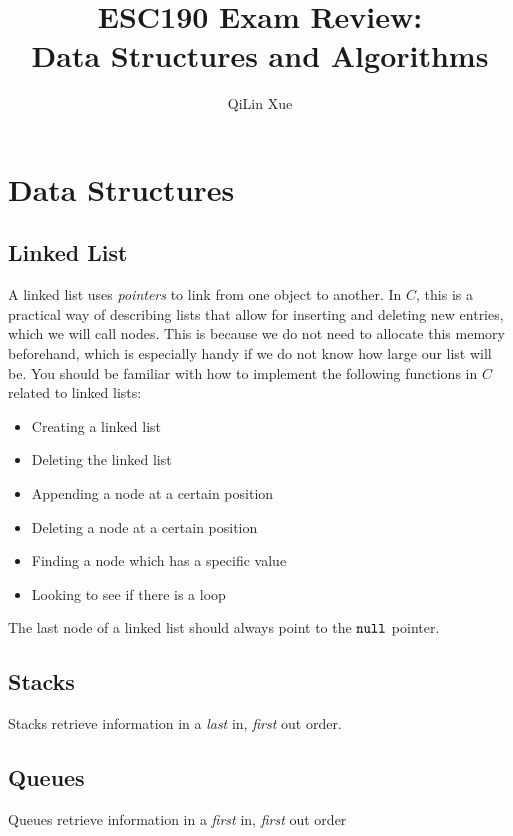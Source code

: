 \documentclass{article}
\title{\textbf{ESC190 Exam Review:} \\ Data Structures and Algorithms}
\author{QiLin Xue}
\begin{document}
    \maketitle
    \tableofcontents
    \newpage
    \section{Data Structures}
    \subsection{Linked List}
    A linked list uses \textit{pointers} to link from one object to another. In $C$, this is a practical way of describing lists that allow for inserting and deleting new entries, which we will call nodes. This is because we do not need to allocate this memory beforehand, which is especially handy if we do not know how large our list will be. You should be familiar with how to implement the following functions in $C$ related to linked lists:
    \begin{itemize}
        \item Creating a linked list
        \item Deleting the linked list
        \item Appending a node at a certain position
        \item Deleting a node at a certain position
        \item Finding a node which has a specific value
        \item Looking to see if there is a loop
    \end{itemize}
    The last node of a linked list should always point to the $\verb#null#$ pointer.
    \label{linked list}
    \subsection{Stacks}
    Stacks retrieve information in a \textit{last} in, \textit{first} out order.

    \subsection{Queues}
    Queues retrieve information in a \textit{first} in, \textit{first} out order
\end{document}
